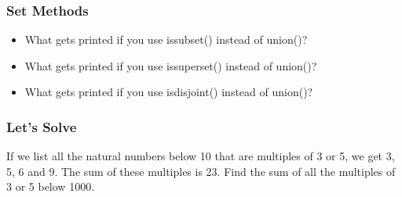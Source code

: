\documentclass[14pt]{beamer}
\begin{document}
    \begin{frame}
	\frametitle{Set Methods}
	\begin{itemize}
	    \item What gets printed if you use issubset() instead of union()?
	    \item What gets printed if you use issuperset() instead of union()?
	    \item What gets printed if you use isdisjoint() instead of union()?
	\end{itemize}
    \end{frame}
    \begin{frame}
	\frametitle{Let's Solve}
	\begin{description}
	    If we list all the natural numbers below 10 that are multiples of 3 or 5, we get 3, 5, 6 and 9. The sum of these multiples is 23. Find the sum of all the multiples of 3 or 5 below 1000.
	\end{description}
    \end{frame}
\end{document}
